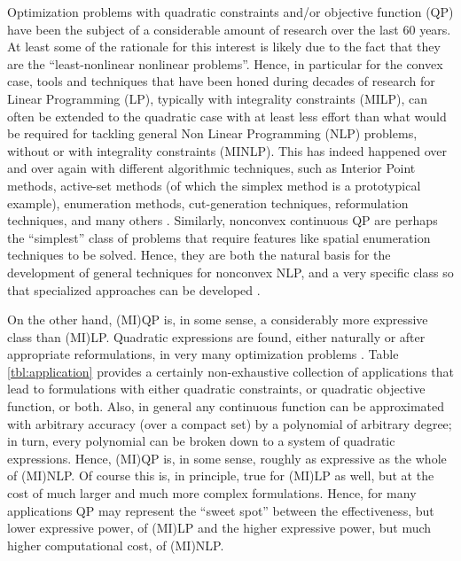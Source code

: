 Optimization problems with quadratic constraints and/or objective function (QP) have been the subject of a considerable amount of research over the last 60 years. At least some of the rationale for this interest is likely due to the fact that they are the ``least-nonlinear nonlinear problems''. Hence, in particular for the convex case, tools and techniques that have been honed during decades of research for Linear Programming (LP), typically with integrality constraints (MILP), can often be extended to the quadratic case with at least less effort than what would be required for tackling general Non Linear Programming (NLP) problems, without or with integrality constraints (MINLP). This has indeed happened over and over again with different algorithmic techniques, such as Interior Point methods, active-set methods (of which the simplex method is a prototypical example), enumeration methods, cut-generation techniques, reformulation techniques, and many others \cite{BS09}.
Similarly, nonconvex continuous QP are perhaps the ``simplest'' class of problems that require features like spatial enumeration techniques to be solved. 
Hence, they are both the natural basis for the development of general techniques for nonconvex NLP, and a very specific class so that specialized approaches can be developed \cite{Dur2010,Burer2012}.

On the other hand, (MI)QP is, in some sense, a considerably more expressive class than (MI)LP. Quadratic expressions are found, either naturally or after appropriate reformulations, in very many optimization problems \cite{Kochenberger2014}. Table \ref{tbl:application} provides a certainly non-exhaustive collection of applications that lead to formulations with either quadratic constraints, or quadratic objective function, or both. Also, in general any continuous function can be approximated with arbitrary accuracy (over a compact set) by a polynomial of arbitrary degree; in turn, every polynomial can be broken down to a system of quadratic expressions. Hence, (MI)QP is, in some sense, roughly as expressive as the whole of (MI)NLP. Of course this is, in principle, true for (MI)LP as well, but at the cost of much larger and much more complex formulations. Hence, for many applications QP may represent the ``sweet spot'' between the effectiveness, but lower expressive power, of (MI)LP and the higher expressive power, but much higher computational cost, of (MI)NLP.

